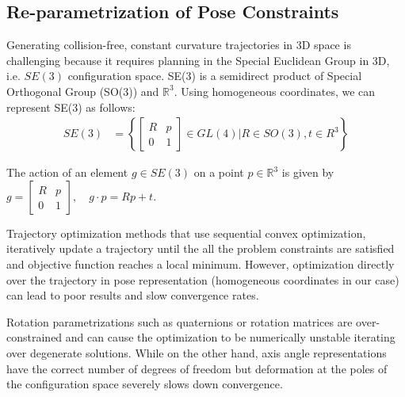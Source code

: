 \subsection{\textbf{Re-parametrization of Pose Constraints}}
Generating collision-free, constant curvature trajectories in 3D space is challenging because it requires planning in the Special Euclidean Group in 3D, i.e. $SE(3)$ configuration space.
SE(3) is a semidirect product of Special Orthogonal Group (SO(3)) and $\mathbb{R}^3$. Using homogeneous coordinates, we can represent SE(3) as follows:
\begin{equation}
\begin{aligned}
SE(3) &= \left\{
\begin{bmatrix}
R & p \\
0 & 1
\end{bmatrix}
\in GL(4) \rvert R \in SO(3), t \in R^3 \right\}
\end{aligned}
\end{equation}

\noindent The action of an element $g \in SE(3)$ on a point $p \in \mathbb{R}^3$ is given by 
$g = \begin{bmatrix}
R & p \\
0 & 1 
\end{bmatrix},
\quad g \cdot p = Rp + t $.


Trajectory optimization methods that use sequential convex optimization, iteratively update a trajectory until the all the problem constraints are satisfied and objective function reaches a local minimum. However, optimization directly over the trajectory in pose representation (homogeneous coordinates in our case) can lead to poor results and slow convergence rates.

Rotation parametrizations such as quaternions or rotation matrices are over-constrained and can cause the optimization to be numerically unstable iterating over degenerate solutions. 
While on the other hand, axis angle representations have the correct number of degrees of freedom but deformation at the poles of the configuration space severely slows down convergence.

